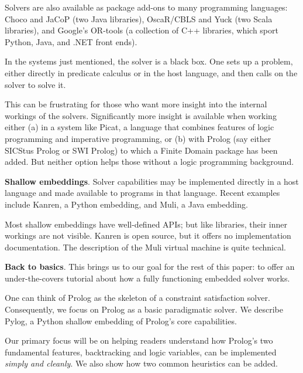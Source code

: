 Solvers are also available as package add-ons to many programming languages: Choco\cite{prud2019choco} and JaCoP\cite{kuchcinski2013jacop} (two Java libraries), OscaR/CBLS\cite{Oscar} and Yuck\cite{Yuck} (two Scala libraries), and Google's OR-tools\cite{Google-OR-tools} (a collection of C++ libraries, which sport Python, Java, and .NET front ends).

In the systems just mentioned, the solver is a black box. One sets up a problem, either directly in predicate calculus or in the host language, and then calls on the solver to solve it. 

This can be frustrating for those who want more insight into the internal workings of the solvers. Significantly more insight is available when working either (a) in a system like Picat\cite{zhou2015constraint}, a language that combines features of logic programming and imperative programming, or (b) with Prolog (say either SICStus Prolog\cite{carlsson2014sicstus} or SWI Prolog\cite{swi-prolog}) to which a Finite Domain package has been added. But neither option helps those without a logic programming background. 

\smallv\noindent\textbf{Shallow embeddings}.  Solver capabilities may be implemented directly in a host language and made available to programs in that language.\cite{hoare1998unifying, gibbons2014folding} Recent examples include Kanren\cite{Rocklin2019}, a Python embedding, and Muli\cite{dageforde2018constraint}, a Java embedding.

Most shallow embeddings have well-defined APIs; but like libraries, their inner workings are not visible.  Kanren is open source, but it offers no implementation documentation. The description of the  Muli virtual machine\cite{dageforde2019compiler} is quite technical. %

\smallv\noindent\textbf{Back to basics}. This brings us to our goal for the rest of this paper: to offer an under-the-covers tutorial about how a fully functioning embedded solver works. 

One can think of Prolog as the skeleton of a constraint satisfaction solver. Consequently, we focus on Prolog as a basic paradigmatic solver. We describe Pylog, a Python shallow embedding of Prolog's core capabilities. 

Our primary focus will be on helping readers understand how Prolog's two fundamental features, backtracking and logic variables, can be implemented \textit{simply and cleanly}. We also show how two common heuristics can be added. 

